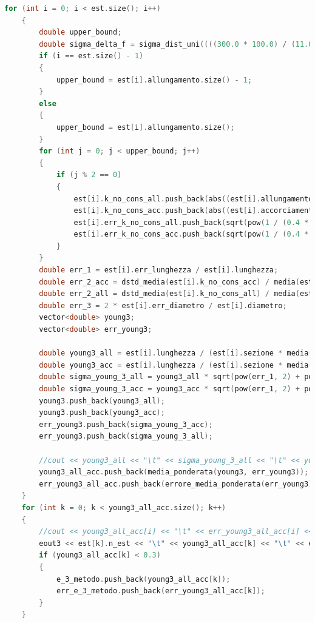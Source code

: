 \documentclass[a4paper,11pt,oneside]{article}
\begin{document}
\begin{lstlisting}[language=C++, label=lst:seconda_parte, caption=seconda\_parte]
	for (int i = 0; i < est.size(); i++)
	{
		double upper_bound;
		double sigma_delta_f = sigma_dist_uni((((300.0 * 100.0) / (11.0 * 1000.0)) * (4.0 * 9.806 / 1000.0)), 1.0);
		if (i == est.size() - 1) 
		{
			upper_bound = est[i].allungamento.size() - 1;
		}
		else
		{
			upper_bound = est[i].allungamento.size();
		}
		for (int j = 0; j < upper_bound; j++)
		{
			if (j % 2 == 0)
			{
				est[i].k_no_cons_all.push_back(abs((est[i].allungamento[j + 1] - est[i].allungamento[j])) / (0.4 * 9.806));
				est[i].k_no_cons_acc.push_back(abs((est[i].accorciamento[j + 1] - est[i].accorciamento[j])) / (0.4 * 9.806));
				est[i].err_k_no_cons_all.push_back(sqrt(pow(1 / (0.4 * 9.806), 2) * pow(est[i].err_delta_x_all[j], 2) + pow((-(est[i].allungamento[j + 1] - est[i].allungamento[j]) / pow((0.4 * 9.806), 2)), 2) * pow(sigma_delta_f, 2)));
				est[i].err_k_no_cons_acc.push_back(sqrt(pow(1 / (0.4 * 9.806), 2) * pow(est[i].err_delta_x_acc[j], 2) + pow((-(est[i].accorciamento[j + 1] - est[i].accorciamento[j]) / pow((0.4 * 9.806), 2)), 2) * pow(sigma_delta_f, 2))); 
			}
		}
		double err_1 = est[i].err_lunghezza / est[i].lunghezza;
		double err_2_acc = dstd_media(est[i].k_no_cons_acc) / media(est[i].k_no_cons_acc);
		double err_2_all = dstd_media(est[i].k_no_cons_all) / media(est[i].k_no_cons_all);
		double err_3 = 2 * est[i].err_diametro / est[i].diametro;
		vector<double> young3;
		vector<double> err_young3;

		double young3_all = est[i].lunghezza / (est[i].sezione * media(est[i].k_no_cons_all));
		double young3_acc = est[i].lunghezza / (est[i].sezione * media(est[i].k_no_cons_acc));
		double sigma_young_3_all = young3_all * sqrt(pow(err_1, 2) + pow(err_2_all, 2) + pow(err_3, 2));
		double sigma_young_3_acc = young3_acc * sqrt(pow(err_1, 2) + pow(err_2_acc, 2) + pow(err_3, 2));
		young3.push_back(young3_all);
		young3.push_back(young3_acc);
		err_young3.push_back(sigma_young_3_acc);
		err_young3.push_back(sigma_young_3_all);

		//cout << young3_all << "\t" << sigma_young_3_all << "\t" << young3_acc << "\t" << sigma_young_3_acc << endl; //Stampa modulo young in all e acc
		young3_all_acc.push_back(media_ponderata(young3, err_young3));
		err_young3_all_acc.push_back(errore_media_ponderata(err_young3));
	}
	for (int k = 0; k < young3_all_acc.size(); k++)
	{
		//cout << young3_all_acc[i] << "\t" << err_young3_all_acc[i] << endl;
		eout3 << est[k].n_est << "\t" << young3_all_acc[k] << "\t" << err_young3_all_acc[k] << endl;
		if (young3_all_acc[k] < 0.3) 
		{
			e_3_metodo.push_back(young3_all_acc[k]);
			err_e_3_metodo.push_back(err_young3_all_acc[k]);
		}
	}


\end{lstlisting}
\end{document}
